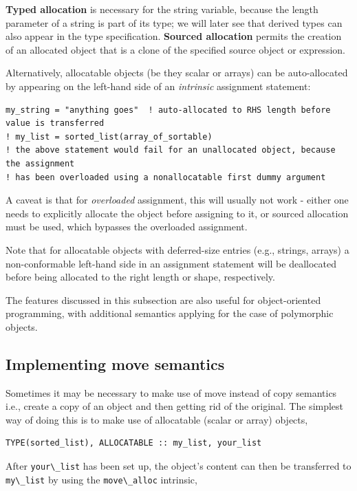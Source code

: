 \documentclass[
  paper=a4,
  ,captions=tableheading
]{scrartcl}
\newcommand{\passthrough}[1]{#1}
\begin{document}
\textbf{Typed allocation} is necessary for the string variable, because
the length parameter of a string is part of its type; we will later see
that derived types can also appear in the type specification.
\textbf{Sourced allocation} permits the creation of an allocated object
that is a clone of the specified source object or expression.

Alternatively, allocatable objects (be they scalar or arrays) can be
auto-allocated by appearing on the left-hand side of an \emph{intrinsic}
assignment statement:

\begin{lstlisting}
my_string = "anything goes"  ! auto-allocated to RHS length before value is transferred
! my_list = sorted_list(array_of_sortable)
! the above statement would fail for an unallocated object, because the assignment
! has been overloaded using a nonallocatable first dummy argument
\end{lstlisting}

A caveat is that for \emph{overloaded} assignment, this will usually not
work - either one needs to explicitly allocate the object before
assigning to it, or sourced allocation must be used, which bypasses the
overloaded assignment.

Note that for allocatable objects with deferred-size entries (e.g.,
strings, arrays) a non-conformable left-hand side in an assignment
statement will be deallocated before being allocated to the right length
or shape, respectively.

The features discussed in this subsection are also useful for
object-oriented programming, with additional semantics applying for the
case of polymorphic objects.

\subsection{Implementing move
semantics}\label{implementing-move-semantics}

Sometimes it may be necessary to make use of move instead of copy
semantics i.e., create a copy of an object and then getting rid of the
original. The simplest way of doing this is to make use of allocatable
(scalar or array) objects,

\begin{lstlisting}
TYPE(sorted_list), ALLOCATABLE :: my_list, your_list
\end{lstlisting}

After \passthrough{\lstinline!your\_list!} has been set up, the object's
content can then be transferred to \passthrough{\lstinline!my\_list!} by
using the \passthrough{\lstinline!move\_alloc!} intrinsic,
\end{document}

